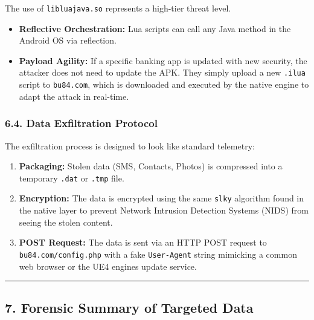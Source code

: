 \documentclass[
]{article}
\begin{document}
The use of \texttt{libluajava.so} represents a high-tier threat level.

\begin{itemize}
\item
  \textbf{Reflective Orchestration:} Lua scripts can call any Java
  method in the Android OS via reflection.
\item
  \textbf{Payload Agility:} If a specific banking app is updated with
  new security, the attacker does not need to update the APK. They
  simply upload a new \texttt{.ilua} script to \texttt{bu84.com}, which
  is downloaded and executed by the native engine to adapt the attack in
  real-time.
\end{itemize}

\subsubsection{\texorpdfstring{\textbf{6.4. Data Exfiltration
Protocol}}{6.4. Data Exfiltration Protocol}}\label{64-data-exfiltration-protocol}

The exfiltration process is designed to look like standard telemetry:

\begin{enumerate}
\def\labelenumi{\arabic{enumi}.}
\item
  \textbf{Packaging:} Stolen data (SMS, Contacts, Photos) is compressed
  into a temporary \texttt{.dat} or \texttt{.tmp} file.
\item
  \textbf{Encryption:} The data is encrypted using the same
  \texttt{slky} algorithm found in the native layer to prevent Network
  Intrusion Detection Systems (NIDS) from seeing the stolen content.
\item
  \textbf{POST Request:} The data is sent via an HTTP POST request to
  \texttt{bu84.com/config.php} with a fake \texttt{User-Agent} string
  mimicking a common web browser or the UE4 engine\textquotesingle s
  update service.
\end{enumerate}

\begin{center}\rule{0.5\linewidth}{0.5pt}\end{center}

\subsection{\texorpdfstring{\textbf{7. Forensic Summary of Targeted
Data}}{7. Forensic Summary of Targeted Data}}\label{7-forensic-summary-of-targeted-data}
\end{document}
